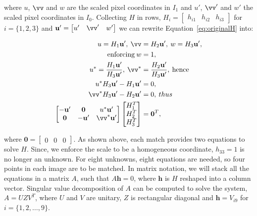 \documentclass[12pt]{article}
\begin{document}
where $u$, $\vv$ and $w$ are the scaled pixel coordinates in $I_1$ and $u'$, $\vv'$ and $w'$ the scaled pixel coordinates in $I_0$.
Collecting $H$ in rows, $H_i = \begin{bmatrix} h_{i1} & h_{i2} & h_{i3} \end{bmatrix}$ for $i = \lbrace 1,2,3 \rbrace$ and $\mathbf{u'} = \begin{bmatrix} u' & \vv' & w' \end{bmatrix}$ we can rewrite Equation~\ref{eq:originalH} into:

\begin{equation}
\begin{aligned}
	u = H_1 \mathbf{u'}, \: \vv &= H_2 \mathbf{u'}, \: w = H_3 \mathbf{u'}, \\ 
	\text{enforcing} \: w &= 1, \\
	u^* = \frac{H_1 \mathbf{u'}}{ H_3 \mathbf{u'}}, \: \vv^* &= \frac{H_2 \mathbf{u'}}{ H_3 \mathbf{u'}}, \: \text{hence} \\	
	u^*H_3\mathbf{u'} - H_1\mathbf{u'} &= 0, \\
	\vv^* H_3\mathbf{u'} - H_2\mathbf{u'} &= 0, \: thus\\
	\begin{bmatrix}
	-\mathbf{u'} & \mathbf{0} & u^*\mathbf{u'} \\
	\mathbf{0} & -\mathbf{u'} & \vv^*\mathbf{u'}
	\end{bmatrix}
	\begin{bmatrix}
	H_1^T \\
	H_2^T \\ 
	H_3^T 
	\end{bmatrix}
	&= \mathbf{0}^T,
\end{aligned}
\label{eq:derivatingH}
\end{equation}

where $\mathbf{0} = \begin{bmatrix} 0 & 0 & 0 \end{bmatrix}$. 
As shown above, each match provides two equations to solve $H$.
Since, we enforce the scale to be a homogeneous coordinate, $h_{33} = 1$ is no longer an unknown.
For eight unknowns, eight equations are needed, so four points in each image are to be matched.
In matrix notation, we will stack all the equations in a matrix $A$, such that $A\mathbf{h}=0$, where $\mathbf{h}$ is $H$ reshaped into a column vector.
Singular value decomposition of $A$ can be computed to solve the system, $A = UZV^T$, where $U$ and $V$ are unitary, $Z$ is rectangular diagonal and $\mathbf{h} = V_{i9}$ for $i = \lbrace 1,2, \ldots, 9 \rbrace$.
\end{document}
